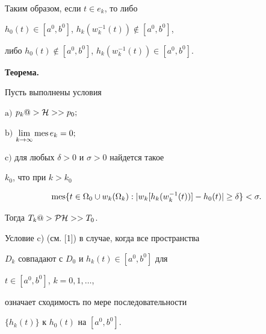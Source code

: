 Таким образом, если $t\in e_k$, то либо


$h_0(t) \in[a^0,b^0]$, $h_k(w_k^{-1}(t))\notin[a^0,b^0]$,


либо $h_0(t)\not\in[a^0,b^0]$, $h_k(w_k^{-1}(t))\in[a^0,b^0]$.





{\bf Теорема.} {\it


Пусть выполнены условия





$\mathrm{a)}$ $p_k@>{\cal H}>> p_0;$





$\mathrm{b)}$ $\lim\limits_{k\to\infty} \operatorname{mes} e_k =0;$





$\mathrm{c)}$ для любых $\delta >0$ и $\sigma >0$ найдется такое


$k_0$, что при $k>k_0$


\begin{equation}


\mes \{t\in\Omega_0\cup w_k(\Omega_k):


|w_k[h_k(w_k^{-1}(t))]-h_0(t)|


\geq \delta\} <\sigma.


\end{equation}


Тогда $T_k@>{{\cal P}{\cal H}}>> T_0$.


}





\begin{note} Условие c) (см. [1]) в случае, когда все пространства


$D_k$ совпадают с $D_0$ и $h_k(t)\in[a^0,b^0]$ для


$t\in[a^0,b^0]$, $k=0,1,\dotsc$,


означает сходимость по мере последовательности


$\{h_k(t)\}$ к $h_0(t)$ на $[a^0,b^0]$.


\end{note}





